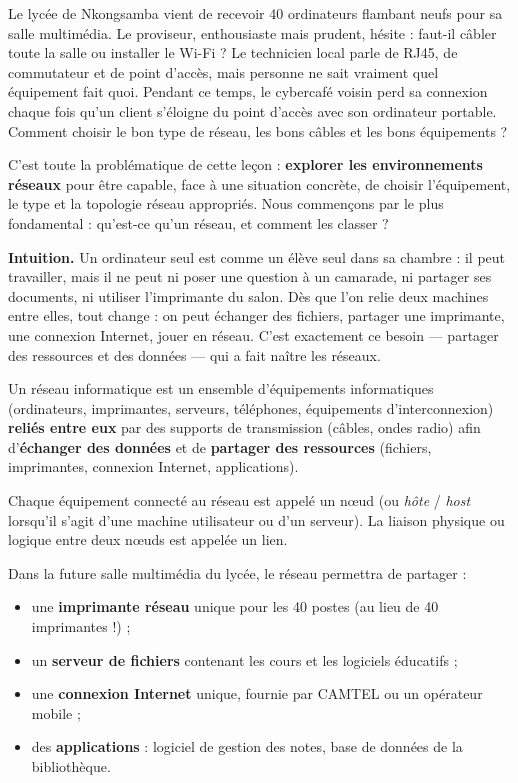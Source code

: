 \documentclass[11pt]{article}
\newcommand{\cle}[1]{{\popxbold\color{popdark}#1}}
\newcounter{popsec}
\newcounter{popsub}
\newcommand{\courssub}[1]{%
  \stepcounter{popsub}%
  \par\vspace{9pt}\noindent{\popxbold\fontsize{11.5}{13}\selectfont\color{popink}{\color{poporange}\thepopsec.\thepopsub}\hspace{6pt}#1}\par\nopagebreak\vspace{4pt}
}
\begin{document}
Le lycée de Nkongsamba vient de recevoir 40 ordinateurs flambant neufs pour sa salle multimédia. Le proviseur, enthousiaste mais prudent, hésite : faut-il câbler toute la salle ou installer le Wi-Fi ? Le technicien local parle de RJ45, de commutateur et de point d'accès, mais personne ne sait vraiment quel équipement fait quoi. Pendant ce temps, le cybercafé voisin perd sa connexion chaque fois qu'un client s'éloigne du point d'accès avec son ordinateur portable. Comment choisir le bon type de réseau, les bons câbles et les bons équipements ?

C'est toute la problématique de cette leçon : \textbf{explorer les environnements réseaux} pour être capable, face à une situation concrète, de choisir l'équipement, le type et la topologie réseau appropriés. Nous commençons par le plus fondamental : qu'est-ce qu'un réseau, et comment les classer ?

\courssub{Qu'est-ce qu'un réseau informatique ?}

\textbf{Intuition.} Un ordinateur seul est comme un élève seul dans sa chambre : il peut travailler, mais il ne peut ni poser une question à un camarade, ni partager ses documents, ni utiliser l'imprimante du salon. Dès que l'on relie deux machines entre elles, tout change : on peut échanger des fichiers, partager une imprimante, une connexion Internet, jouer en réseau. C'est exactement ce besoin — \cle{partager des ressources et des données} — qui a fait naître les réseaux.

\begin{definition}
Un \cle{réseau informatique} est un ensemble d'équipements informatiques (ordinateurs, imprimantes, serveurs, téléphones, équipements d'interconnexion) \textbf{reliés entre eux} par des supports de transmission (câbles, ondes radio) afin d'\textbf{échanger des données} et de \textbf{partager des ressources} (fichiers, imprimantes, connexion Internet, applications).

Chaque équipement connecté au réseau est appelé un \cle{nœud} (ou \emph{hôte} / \emph{host} lorsqu'il s'agit d'une machine utilisateur ou d'un serveur). La liaison physique ou logique entre deux nœuds est appelée un \cle{lien}.
\end{definition}

\begin{exemplebox}
Dans la future salle multimédia du lycée, le réseau permettra de partager :
\begin{itemize}
\item une \textbf{imprimante réseau} unique pour les 40 postes (au lieu de 40 imprimantes !) ;
\item un \textbf{serveur de fichiers} contenant les cours et les logiciels éducatifs ;
\item une \textbf{connexion Internet} unique, fournie par CAMTEL ou un opérateur mobile ;
\item des \textbf{applications} : logiciel de gestion des notes, base de données de la bibliothèque.
\end{itemize}
\end{exemplebox}
\end{document}
